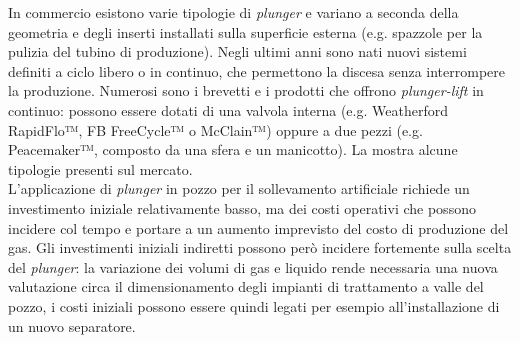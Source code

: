 In commercio esistono varie tipologie di \textit{plunger} e variano a seconda della geometria e degli inserti installati sulla superficie esterna (e.g. spazzole per la pulizia del tubino di produzione). Negli ultimi anni sono nati nuovi sistemi definiti a ciclo libero o in continuo, che permettono la discesa senza interrompere la produzione. Numerosi sono i brevetti e i prodotti che offrono \textit{plunger-lift} in continuo: possono essere dotati di una valvola interna (e.g. Weatherford RapidFlo™, FB FreeCycle™ o McClain™) oppure a due pezzi (e.g. Peacemaker™, composto da una sfera e un manicotto). La  mostra alcune tipologie presenti sul mercato.\\
L'applicazione di \textit{plunger} in pozzo per il sollevamento artificiale richiede un investimento iniziale relativamente basso, ma dei costi operativi che possono incidere col tempo e portare a un aumento imprevisto del costo di produzione del gas. Gli investimenti iniziali indiretti possono però incidere fortemente sulla scelta del \textit{plunger}: la variazione dei volumi di gas e liquido rende necessaria una nuova valutazione circa il dimensionamento degli impianti di trattamento a valle del pozzo, i costi iniziali possono essere quindi legati per esempio all'installazione di un nuovo separatore.

